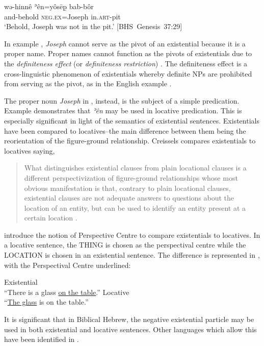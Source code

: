 \documentclass[output=paper,colorlinks,citecolor=brown,draft,draftmode]{langscibook}
\begin{document}
\begin{exe}\ex \label{ex:heb-Joseph}
    \gll  wə-hinnê ʾên=yôsēp̱ bab-bôr\\
and-behold \textsc{neg.ex}=Joseph in.\textsc{art}-pit \\
    \glt `Behold, Joseph was not in the pit.'
    \mbox{[BHS Genesis 37:29]} \end{exe}
%
In example , \textit{Joseph} cannot serve as the pivot of an
existential because it is a proper name. Proper names cannot function as
the pivots of existentials due to the \textit{definiteness effect}
(or \textit{definiteness restriction}) \parencites[195]{Milsark1974}%
{Leonetti2008}. The definiteness effect is a cross-linguistic
phenomenon of existentials whereby definite NPs are prohibited from serving
as the pivot, as in the English example .
%
\begin{exe}\label{ex:heb-eng-dog}  \end{exe}
% 
The proper noun \textit{Joseph} in , instead, is the
subject of a simple predication. Example  demonstrates
that \textit{ʾên} may be used in locative predication. This is especially
significant in light of the semantics of existential sentences.
Existentials have been compared to locatives–the main difference between
them being the reorientation of the figure-ground relationship. Creissels
compares existentials to locatives saying,
%
\begin{quote}
  What distinguishes existential clauses from plain locational   clauses is
  a different perspectivization of figure-ground   relationships whose most
  obvious manifestation is that, contrary   to plain locational clauses,
  existential clauses are not adequate   answers to questions about the
  location of an entity, but can be   used to identify an entity present at
  a certain location \citep[2]{Creissels2014}. 
\end{quote}
%
\textcite{ParteeBorschev2002} introduce the notion of Perspective Centre
to compare existentials to locatives. In a locative sentence, the THING is
chosen as the perspectival centre while the LOCATION is chosen in an
existential sentence. The difference is represented in
,
with the Perspectival Centre underlined:
%
\begin{exe}\ex \label{ex:heb-eng-glass}
 \begin{xlist}
 \ex Existential    \\
 ``There is a glass \uline{on the table}.''
   \ex Locative \\
  ``\uline{The glass} is on the table.''
   \end{xlist}\end{exe}
It is significant that in Biblical Hebrew, the negative existential
particle may be used in both existential and locative sentences. Other
languages which allow this have been identified in \textcite{Veselinova2013}.
\end{document}
